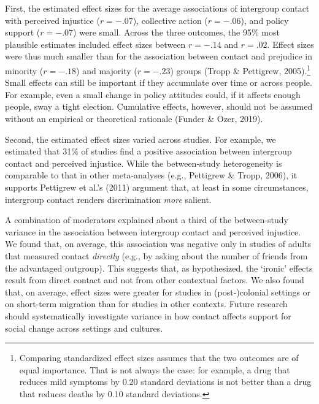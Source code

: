 \documentclass[12pt, letterpaper]{article}
\begin{document}
First, the estimated effect sizes for the average associations of
intergroup contact with perceived injustice (\(r = -.07\)), collective
action (\(r = -.06\)), and policy support (\(r = -.07\)) were small.
Across the three outcomes, the 95\% most plausible estimates included
effect sizes between \(r = -.14\) and \(r = .02\). Effect sizes were
thus much smaller than for the association between contact and prejudice
in minority (\(r = -.18\)) and majority (\(r = -.23\)) groups (Tropp \&
Pettigrew, 2005).\footnote{Comparing standardized effect sizes assumes
  that the two outcomes are of equal importance. That is not always the
  case: for example, a drug that reduces mild symptoms by 0.20 standard
  deviations is not better than a drug that reduces deaths by 0.10
  standard deviations.} Small effects can still be important if they
accumulate over time or across people. For example, even a small change
in policy attitudes could, if it affects enough people, sway a tight
election. Cumulative effects, however, should not be assumed without an
empirical or theoretical rationale (Funder \& Ozer, 2019).

Second, the estimated effect sizes varied across studies. For example,
we estimated that 31\% of studies find a positive association between
intergroup contact and perceived injustice. While the between-study
heterogeneity is comparable to that in other meta-analyses (e.g.,
Pettigrew \& Tropp, 2006), it supports Pettigrew et al.'s (2011)
argument that, at least in some circumstances, intergroup contact
renders discrimination \emph{more} salient.

A combination of moderators explained about a third of the between-study
variance in the association between intergroup contact and perceived
injustice. We found that, on average, this association was negative only
in studies of adults that measured contact \emph{directly} (e.g., by
asking about the number of friends from the advantaged outgroup). This
suggests that, as hypothesized, the `ironic' effects result from direct
contact and not from other contextual factors. We also found that, on
average, effect sizes were greater for studies in (post-)colonial
settings or on short-term migration than for studies in other contexts.
Future research should systematically investigate variance in how
contact affects support for social change across settings and cultures.
\end{document}
